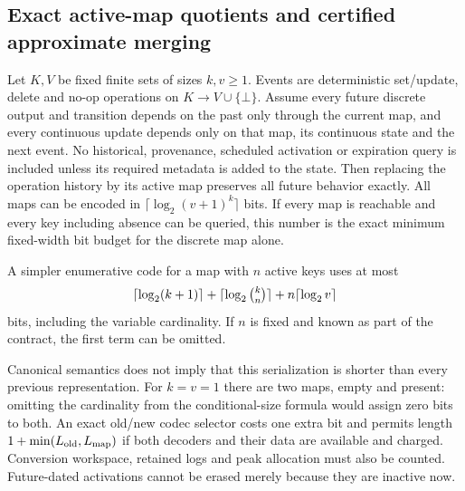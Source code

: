\subsection{Exact active-map quotients and certified approximate merging}
\begin{proposition}
\label{III:M:prop:active-map}
Let $K,V$ be fixed finite sets of sizes $k,v\ge1$. Events are deterministic
set/update, delete and no-op operations on $K\to V\cup\{\bot\}$.
Assume every future discrete output and transition depends on the past
only through the current map, and every continuous update depends only
on that map, its continuous state and the next event. No historical,
provenance, scheduled activation or expiration query is included unless
its required metadata is added to the state.
Then replacing the operation history by its active map preserves all
future behavior exactly. All maps can be encoded in
$\lceil\log_2 (v+1)^k\rceil$ bits. If every map is reachable and every
key including absence can be queried, this number is the exact minimum
fixed-width bit budget for the discrete map alone.

A simpler enumerative code for a map with $n$ active keys uses at most
\[
 \lceil\log_2(k+1)\rceil+
 \lceil\log_2\tbinom{k}{n}\rceil+n\lceil\log_2 v\rceil
\]
bits, including the variable cardinality. If $n$ is fixed and known as
part of the contract, the first term can be omitted.
\end{proposition}

Canonical semantics does not imply that this serialization is shorter than
every previous representation. For $k=v=1$ there are two maps, empty and
present: omitting the cardinality from the conditional-size formula would
assign zero bits to both. An exact old/new codec selector costs one extra
bit and permits length $1+\min(L_{\rm old},L_{\rm map})$ if both decoders
and their data are available and charged. Conversion workspace, retained
logs and peak allocation must also be counted. Future-dated activations
cannot be erased merely because they are inactive now.

